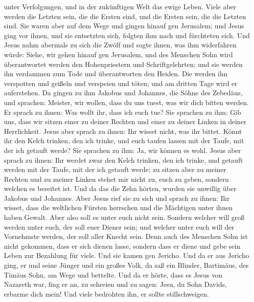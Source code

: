 unter Verfolgungen, und in der zukünftigen Welt das ewige Leben.
 Viele aber werden die Letzten sein, die die Ersten sind,
und die Ersten sein, die die Letzten sind.  Sie waren aber
auf dem Wege und gingen hinauf gen Jerusalem; und Jesus ging vor ihnen,
und sie entsetzten sich, folgten ihm nach und fürchteten sich. Und Jesus
nahm abermals zu sich die Zwölf und sagte ihnen, was ihm widerfahren
würde:  Siehe, wir gehen hinauf gen Jerusalem, und des
Menschen Sohn wird überantwortet werden den Hohenpriestern und
Schriftgelehrten; und sie werden ihn verdammen zum Tode und
überantworten den Heiden.  Die werden ihn verspotten und
geißeln und verspeien und töten; und am dritten Tage wird er
auferstehen.  Da gingen zu ihm Jakobus und Johannes, die
Söhne des Zebedäus, und sprachen: Meister, wir wollen, dass du uns
tuest, was wir dich bitten werden.  Er sprach zu ihnen: Was
wollt ihr, dass ich euch tue?  Sie sprachen zu ihm: Gib
uns, dass wir sitzen einer zu deiner Rechten und einer zu deiner Linken
in deiner Herrlichkeit.  Jesus aber sprach zu ihnen: Ihr
wisset nicht, was ihr bittet. Könnt ihr den Kelch trinken, den ich
trinke, und euch taufen lassen mit der Taufe, mit der ich getauft werde?
 Sie sprachen zu ihm: Ja, wir können es wohl. Jesus aber
sprach zu ihnen: Ihr werdet zwar den Kelch trinken, den ich trinke, und
getauft werden mit der Taufe, mit der ich getauft werde; 
zu sitzen aber zu meiner Rechten und zu meiner Linken stehet mir nicht
zu, euch zu geben, sondern welchen es bereitet ist.  Und da
das die Zehn hörten, wurden sie unwillig über Jakobus und Johannes.
 Aber Jesus rief sie zu sich und sprach zu ihnen: Ihr
wisset, dass die weltlichen Fürsten herrschen und die Mächtigen unter
ihnen haben Gewalt.  Aber also soll es unter euch nicht
sein. Sondern welcher will groß werden unter euch, der soll euer Diener
sein;  und welcher unter euch will der Vornehmste werden,
der soll aller Knecht sein.  Denn auch des Menschen Sohn
ist nicht gekommen, dass er sich dienen lasse, sondern dass er diene und
gebe sein Leben zur Bezahlung für viele.  Und sie kamen gen
Jericho. Und da er aus Jericho ging, er und seine Jünger und ein großes
Volk, da saß ein Blinder, Bartimäus, des Timäus Sohn, am Wege und
bettelte.  Und da er hörte, dass es Jesus von Nazareth war,
fing er an, zu schreien und zu sagen: Jesu, du Sohn Davids, erbarme dich
mein!  Und viele bedrohten ihn, er sollte stillschweigen.
